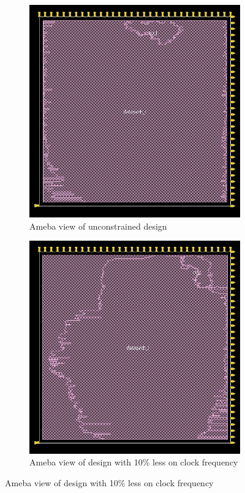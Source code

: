 \begin{figure}[!htbp]
  \centering
  \begin{subfigure}[b]{0.4\linewidth}
\includegraphics[width=\linewidth,scale=0.5,angle=0]{../project/physical_design/images_nopt/DLX_IR_SIZE32_PC_SIZE32_nopt_ameba_prerouting.jpg}
\caption{Ameba view of unconstrained design}
\label{fig:amebano}
  \end{subfigure}
  \begin{subfigure}[b]{0.4\linewidth}
   \includegraphics[width=\linewidth,scale=0.5,angle=0]{../project/physical_design/images_10/DLX_IR_SIZE32_PC_SIZE32_10_ameba_prerouting.jpg}
\caption{Ameba view of design with 10\% less on clock frequency}
\label{fig:ameba10}
  \end{subfigure}

  \label{fig:ameba}
\end{figure}


